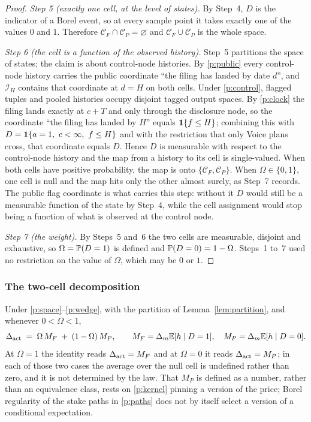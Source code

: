 \begin{proof}
\emph{Step 5 (exactly one cell, at the level of states).} By Step~4, $D$ is the indicator of a Borel
event, so at every sample point it takes exactly one of the values $0$ and $1$. Therefore
$\mathcal C_F \cap \mathcal C_P = \varnothing$ and $\mathcal C_F \cup \mathcal C_P$ is the whole
space.

\emph{Step 6 (the cell is a function of the observed history).} Step~5 partitions the space of
states; the claim is about control-node histories. By \ref{p:public} every control-node history carries the
public coordinate ``the filing has landed by date $d$'', and
$\mathcal I_H$ contains that coordinate at $d = H$ on both cells. Under \ref{p:control}, flagged
tuples and pooled histories occupy disjoint tagged output spaces. By \ref{p:clock} the filing lands exactly at
$c + T$ and only through the disclosure node, so the coordinate ``the filing has landed by $H$''
equals $\mathbf{1}\{f \le H\}$; combining this with $D = \mathbf{1}\{a = 1,\ c < \infty,\ f \le H\}$ and with the
restriction that only Voice plans cross, that coordinate equals $D$. Hence $D$ is measurable with
respect to the control-node history and the map from a history to its cell is single-valued.
When both cells have positive probability, the map is onto
$\{\mathcal C_F, \mathcal C_P\}$. When $\Omega \in \{0,1\}$, one cell is null and the map
hits only the other almost surely, as Step~7 records. The public flag coordinate is what carries
this step: without it
$D$ would still be a measurable function of the state by Step~4, while the cell assignment would
stop being a function of what is observed at the control node.

\emph{Step 7 (the weight).} By Steps~5 and~6 the two cells are measurable, disjoint and exhaustive,
so $\Omega = \mathbb{P}(D = 1)$ is defined and $\mathbb{P}(D = 0) = 1 - \Omega$. Steps~1 to~7 used no
restriction on the value of $\Omega$, which may be $0$ or $1$.
\end{proof}

\subsubsection*{The two-cell decomposition}

\begin{lemma}
\label{lem:two-cell}
Under \ref{p:space}--\ref{p:wedge}, with the partition of Lemma~\ref{lem:partition}, and whenever
$0 < \Omega < 1$,
\begin{equation}
\label{eq:two-cell}
  \Delta_{\mathrm{act}} \;=\; \Omega\,M_F \;+\; (1 - \Omega)\,M_P,
  \qquad
  M_F = \Delta_m\mathbb{E}[h \mid D = 1],
  \quad
  M_P = \Delta_m\mathbb{E}[h \mid D = 0].
\end{equation}
At $\Omega = 1$ the identity reads $\Delta_{\mathrm{act}} = M_F$ and at $\Omega = 0$ it reads $\Delta_{\mathrm{act}} = M_P$; in each
of those two cases the average over the null cell is undefined rather than zero, and it is not
determined by the law. That $M_P$ is defined as a number, rather than an equivalence class, rests
on \ref{p:kernel} pinning a version of the price; Borel regularity of the stake paths in
\ref{p:paths} does not by itself select a version of a conditional expectation.
\end{lemma}

